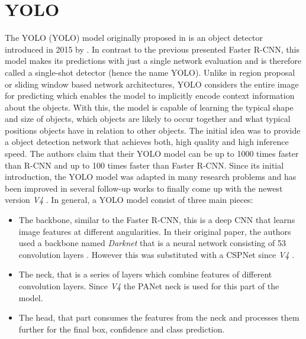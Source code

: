 \section{YOLO}\label{chapter:yolo}

The \acl{YOLO} (\ac{YOLO}) model originally proposed in \autocite{yoloOriginal} is an object detector introduced in 2015 by \citeauthor{yoloOriginal}. In contrast to the previous presented Faster \ac{R-CNN}, this model makes its predictions with just a single network evaluation and is therefore called a single-shot detector (hence the name \ac{YOLO}). Unlike in region proposal or sliding window based network architectures, \ac{YOLO} considers the entire image
for predicting which enables the model to implicitly encode context information about the objects. With this, the model is capable of learning the typical shape and size of objects, which objects are likely to occur together and what typical positions objects have in relation to other objects. The initial idea was to provide a object detection network that achieves both, high quality and high inference speed. The authors claim that their \ac{YOLO} model can be up to 1000 times faster than \ac{R-CNN} and up to 100 times faster than Faster \ac{R-CNN}.
Since its initial introduction, the \ac{YOLO} model was adapted in many research problems and has been improved in several follow-up works \autocite{yolov2} \autocite{yolov3} to finally come up with the newest version \textit{V4} \autocite{yolov4}.
In general, a \ac{YOLO} model consist of three main pieces:
\begin{itemize}
	\item The backbone, similar to the Faster \ac{R-CNN}, this is a deep \ac{CNN} that learns image features at different angularities. In their original paper, the authors used a backbone named \textit{Darknet} that is a neural network consisting of 53 convolution
	layers \autocite{yolov3}. However this was substituted with a CSPNet \autocite{wang2020cspnet} since \textit{V4} \autocite{yolov4}.
	\item The neck, that is a series of layers which combine features of different convolution layers. Since \textit{V4} the PANet \autocite{tan2020efficientdet} neck is used for this part of the model. 
	\item The head, that part consumes the features from the neck and processes them further for the final box, confidence and class prediction.
\end{itemize}
